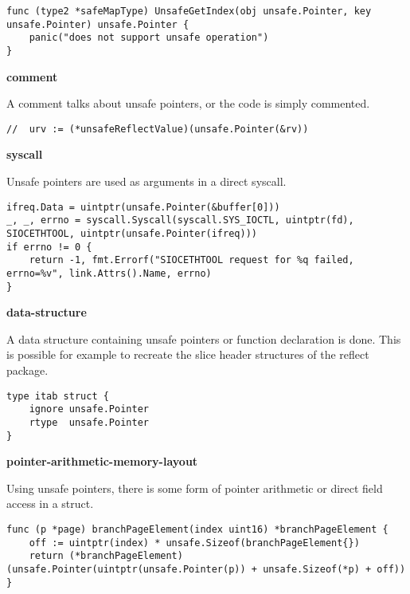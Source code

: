 \begin{lstlisting}[language=Golang, label=lst:survey-small-classexample-unused, caption=Usage class example: unused]
func (type2 *safeMapType) UnsafeGetIndex(obj unsafe.Pointer, key unsafe.Pointer) unsafe.Pointer {
    panic("does not support unsafe operation")
}
\end{lstlisting}


\textbf{comment}

A comment talks about unsafe pointers, or the code is simply commented.

\begin{lstlisting}[language=Golang, label=lst:survey-small-classexample-comment, caption=Usage class example: comment]
// 	urv := (*unsafeReflectValue)(unsafe.Pointer(&rv))
\end{lstlisting}


\textbf{syscall}

Unsafe pointers are used as arguments in a direct syscall.

\begin{lstlisting}[language=Golang, label=lst:survey-small-classexample-syscall, caption=Usage class example: syscall]
ifreq.Data = uintptr(unsafe.Pointer(&buffer[0]))
_, _, errno = syscall.Syscall(syscall.SYS_IOCTL, uintptr(fd), SIOCETHTOOL, uintptr(unsafe.Pointer(ifreq)))
if errno != 0 {
    return -1, fmt.Errorf("SIOCETHTOOL request for %q failed, errno=%v", link.Attrs().Name, errno)
}
\end{lstlisting}


\textbf{data-structure}

A data structure containing unsafe pointers or function declaration is done.
This is possible for example to recreate the slice header structures of the reflect package.

\begin{lstlisting}[language=Golang, label=lst:survey-small-classexample-data-structure, caption=Usage class example: data-structure]
type itab struct {
    ignore unsafe.Pointer
    rtype  unsafe.Pointer
}
\end{lstlisting}


\textbf{pointer-arithmetic-memory-layout}

Using unsafe pointers, there is some form of pointer arithmetic or direct field access in a struct.

\begin{lstlisting}[language=Golang, label=lst:survey-small-classexample-pointer-arithmetic-memory-layout, caption=Usage class example: pointer-arithmetic-memory-layout]
func (p *page) branchPageElement(index uint16) *branchPageElement {
    off := uintptr(index) * unsafe.Sizeof(branchPageElement{})
    return (*branchPageElement)(unsafe.Pointer(uintptr(unsafe.Pointer(p)) + unsafe.Sizeof(*p) + off))
}
\end{lstlisting}


